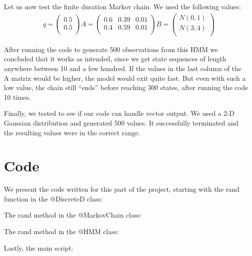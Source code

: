 \documentclass[a4paper, 10pt]{article}
\begin{document}
Let us now test the finite duration Markov chain. We used the following values:
\begin{align}
\nonumber
&q= \left( \begin{array}{c}
0.5 \\
0.5 \\ \end{array} \right) 
A= \left( \begin{array}{ccc}
0.6 & 0.39 & 0.01\\
0.4 & 0.59 & 0.01 \\ \end{array} \right) 
B= \left( \begin{array}{c}
N(0,1)\\
N(3,4) \\ \end{array} \right)
\end{align}

After running the code to generate 500 observations from this HMM we concluded that it works as intended, since we get state sequences of length anywhere between 10 and a few hundred. If the values in the last column of the A matrix would be higher, the model would exit quite fast. But even with such a low value, the chain still ``ends'' before reaching 300 states, after running the code 10 times.

Finally, we tested to see if our code can handle vector output. We used a 2-D Gaussian distribution and generated 500 values. It successfully terminated and the resulting values were in the correct range.

\section{Code}
We present the code written for this part of the project, starting with the rand function in the @DiscreteD class:

The rand method in the @MarkovChain class:

The rand method in the @HMM class:

Lastly, the main script:

\end{document}
